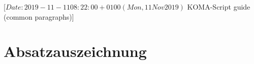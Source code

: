 %
%
%
%
%
%
%
%
% 
%
%
%
%

                 [$Date: 2019-11-11 08:22:00 +0100 (Mon, 11 Nov 2019) $
                  KOMA-Script guide (common paragraphs)]

\section{Absatzauszeichnung}
%
\BeginIndexGroup
{}%

